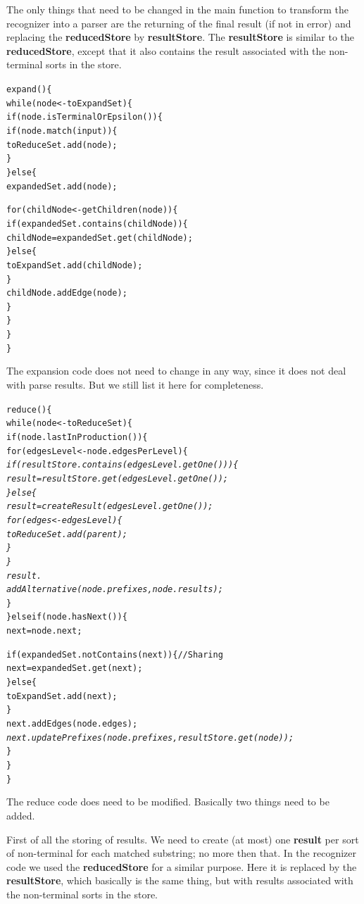 \documentclass[a4paper,10pt]{article}
\begin{document}
The only things that need to be changed in the main function to transform the recognizer into a parser are the returning of the final result (if not in error) and replacing the {\bf reducedStore} by {\bf resultStore}. The {\bf resultStore} is similar to the {\bf reducedStore}, except that it also contains the result associated with the non-terminal sorts in the store.

{\small
\begin{alltt}
expand()\{
  while(node <- toExpandSet)\{
    if(node.isTerminalOrEpsilon())\{
      if(node.match(input))\{
        toReduceSet.add(node);
      \}
    \}else\{
      expandedSet.add(node);
      
      for(childNode <- getChildren(node))\{
        if(expandedSet.contains(childNode))\{
          childNode = expandedSet.get(childNode);
        \}else\{
          toExpandSet.add(childNode);
        \}
        childNode.addEdge(node);
      \}
    \}
  \}
\}
\end{alltt}
}

The expansion code does not need to change in any way, since it does not deal with parse results. But we still list it here for completeness.

\pagebreak
{\small
\begin{alltt}
reduce()\{
  while(node <- toReduceSet)\{
    if(node.lastInProduction())\{
      for(edgesLevel <- node.edgesPerLevel)\{\textit{
        if(resultStore.contains(edgesLevel.getOne()))\{
          result = resultStore.get(edgesLevel.getOne());
        \}else\{
          result = createResult(edgesLevel.getOne());
          for(edges <- edgesLevel)\{
            toReduceSet.add(parent);
          \}
        \}
        result.
            addAlternative(node.prefixes, node.results);}
      \}
    \}else if(node.hasNext())\{
      next = node.next;
      
      if(expandedSet.notContains(next))\{ // Sharing
        next = expandedSet.get(next);
      \}else\{
        toExpandSet.add(next);
      \}
      next.addEdges(node.edges);\textit{
      next.updatePrefixes(node.prefixes, resultStore.get(node));}
    \}
  \}
\}
\end{alltt}
}

The reduce code does need to be modified. Basically two things need to be added.

First of all the storing of results. We need to create (at most) one {\bf result} per sort of non-terminal for each matched substring; no more then that. In the recognizer code we used the {\bf reducedStore} for a similar purpose. Here it is replaced by the {\bf resultStore}, which basically is the same thing, but with results associated with the non-terminal sorts in the store.
\end{document}
